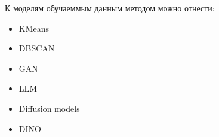 \documentclass[../part_1.tex]{subfiles}
\begin{document}
    \par К моделям обучаеммым данным методом можно отнести:
    \begin{itemize}
        \item KMeans\cite{kmeans}
        \item DBSCAN\cite{dbscan_book}
        \item GAN\cite{gan}
        \item LLM\cite{llm}
        \item Diffusion models\cite{song2021scorebasedgenerativemodelingstochastic}
        \item DINO
    \end{itemize}
\end{document}
